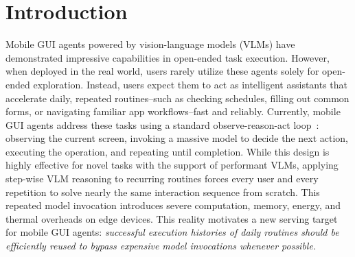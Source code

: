 \section{Introduction}
\label{sec:intro}



Mobile GUI agents powered by vision-language models (VLMs) have demonstrated impressive capabilities in open-ended task execution.
However, when deployed in the real world, users rarely utilize these agents solely for open-ended exploration.
Instead, users expect them to act as intelligent assistants that accelerate daily, repeated routines--such as checking schedules, filling out common forms, or navigating familiar app workflows--fast and reliably.
Currently, mobile GUI agents address these tasks using a standard observe-reason-act loop~\cite{abhyankar2025osworld,rawles2025androidworld,wen2024autodroid,wang2023enabling}: observing the current screen, invoking a massive model to decide the next action, executing the operation, and repeating until completion.
While this design is highly effective for novel tasks with the support of performant VLMs, applying step-wise VLM reasoning to recurring routines forces every user and every repetition to solve nearly the same interaction sequence from scratch.
This repeated model invocation introduces severe computation, memory, energy, and thermal overheads on edge devices.
This reality motivates a new serving target for mobile GUI agents:
\textit{successful execution histories of daily routines should be efficiently reused to bypass expensive model invocations whenever possible.}

